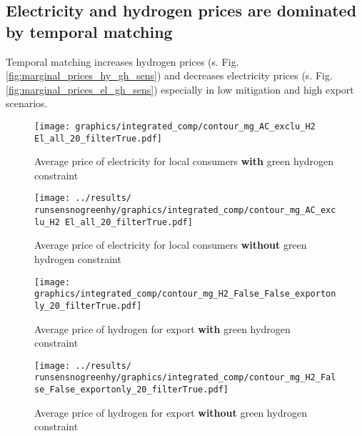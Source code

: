 \subsection{Electricity and hydrogen prices are dominated by temporal matching}
Temporal matching increases hydrogen prices (s. Fig. \ref{fig:marginal_prices_hy_gh_sens}) and decreases electricity prices (s. Fig. \ref{fig:marginal_prices_el_gh_sens}) especially in low mitigation and high export scenarios.


\begin{figure*}[h!] %
    \centering
    \begin{subfigure}[b]{0.49\linewidth}
        \centering
        \texttt{[image: graphics/integrated\_comp/contour\_mg\_AC\_exclu\_H2 El\_all\_20\_filterTrue.pdf]}
        \caption{Average price of electricity for local consumers {\bf with} green hydrogen constraint}
        \label{fig:local_el_price}
    \end{subfigure}
    \hfill
    \begin{subfigure}[b]{0.49\linewidth}
        \centering
        \texttt{[image: ../results/\\runsensnogreenhy/graphics/integrated\_comp/contour\_mg\_AC\_exclu\_H2 El\_all\_20\_filterTrue.pdf]}
        \caption{Average price of electricity for local consumers {\bf without} green hydrogen constraint}
        \label{fig:local_el_price_nogreen}
    \end{subfigure}
    \hfill
    \caption{Marginal prices of electricity with and without green hydrogen constraint}
    \label{fig:marginal_prices_el_gh_sens}
\end{figure*}


\begin{figure*}[h!] %
    \centering
    \begin{subfigure}[b]{0.49\linewidth}
        \centering
        \texttt{[image: graphics/integrated\_comp/contour\_mg\_H2\_False\_False\_exportonly\_20\_filterTrue.pdf]}
        \caption{Average price of hydrogen for export {\bf with} green hydrogen constraint}
        \label{fig:local_hy_price}
    \end{subfigure}
    \hfill
    \begin{subfigure}[b]{0.49\linewidth}
        \centering
        \texttt{[image: ../results/\\runsensnogreenhy/graphics/integrated\_comp/contour\_mg\_H2\_False\_False\_exportonly\_20\_filterTrue.pdf]}
        \caption{Average price of hydrogen for export {\bf without} green hydrogen constraint}
        \label{fig:local_hy_price_nogreen}
    \end{subfigure}
    \hfill
    \caption{Marginal prices of hydrogen for export with and without green hydrogen constraint}
    \label{fig:marginal_prices_hy_gh_sens}
\end{figure*}

